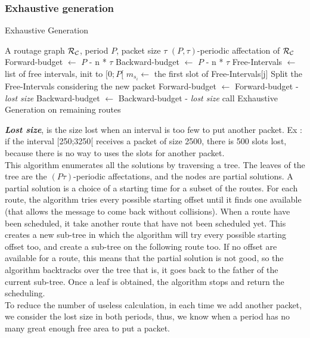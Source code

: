 \documentclass[a4paper,10pt]{article}
\begin{document}
    \subsubsection{Exhaustive generation}
	\begin{algorithm}[H]
	\caption{Exhaustive Generation}  
	\begin{algorithmic}
	\REQUIRE A routage graph ${\cal R}_{\cal C}$, period $P$, packet size $\tau$
	\ENSURE $(P,\tau)$-periodic affectation of ${\cal R}_{\cal C}$
	\STATE Forward-budget $\leftarrow$ $P$ - n * $\tau$
	\STATE Backward-budget $\leftarrow$ $P$ - n * $\tau$
	\STATE Free-Intervals $\leftarrow$ list of free intervals, init to $[0;P[$
	\STATE $m_{s_i} \leftarrow $ the first slot of Free-Intervals[j]
	\STATE Split the Free-Intervals considering the new packet
	\STATE Forward-budget $\leftarrow$ Forward-budget - {\em lost size}
	\STATE Backward-budget $\leftarrow$ Backward-budget - {\em lost size}
	\STATE call Exhaustive Generation on remaining routes
	\ENDIF
	\ENDFOR
	\ENDFOR


      \end{algorithmic}
      \end{algorithm}
      {\bf {\em Lost size}}, is the size lost when an interval is too few to put another packet. Ex : if the interval [250;3250[ receives a packet of size 2500, there is 500 slots lost, because there is no way to uses the slots for another packet.\\
      
	    
      This algorithm enumerates all the solutions by traversing a tree. The leaves of the tree are 
      the $(P\tau)$-periodic affectations, and the nodes are partial solutions. A partial solution is a choice of a starting time for a subset of the routes.
      For each route, the algorithm tries every possible starting offset until it finds one available (that allows the message to come back without collisions). When a route have been scheduled, it take another route that have not been scheduled yet.
      This creates a new sub-tree in which the algorithm will try every possible starting offset too, and create a sub-tree on the following route too.
      If no offset are available for a route, this means that the partial solution is not good, so the algorithm backtracks over the tree that is,
      it goes back to the father of the current sub-tree.
      Once a leaf is obtained, the algorithm stops and return the scheduling.\\      
      To reduce the number of useless calculation, in each time we add another packet, we consider the lost size in both periods, thus, we know when a period has no many great enough free area to put a packet.
\end{document}
